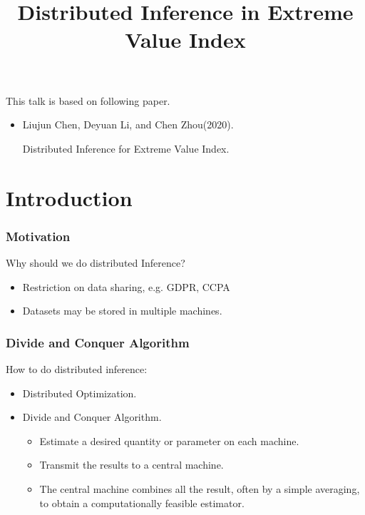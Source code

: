 \documentclass{beamer}
\title{Distributed Inference in Extreme Value Index}
\begin{document}
\begin{frame}
\titlepage
\begin{center}
\end{center}
\end{frame}

\begin{frame}
    \frametitle{}
This talk is based on following paper.
\begin{itemize}
    \item Liujun Chen, Deyuan Li, and Chen Zhou(2020). 
    
    {\color{blue} Distributed Inference for Extreme Value Index.}
\end{itemize}
    

\end{frame}

\section{Introduction}
\begin{frame}
    \frametitle{Motivation}
Why should we do distributed Inference?
\bigskip
\begin{itemize}
    \item Restriction on data sharing, e.g.  GDPR, CCPA
    \bigskip
    \item Datasets may be stored in multiple machines.
\end{itemize}

\end{frame}

\begin{frame}
    \frametitle{Divide and Conquer Algorithm}
How to do distributed inference:
\begin{itemize}
    \item Distributed Optimization. 
    \bigskip
    \item Divide and Conquer Algorithm.
        \begin{itemize}
            \item Estimate a desired quantity or parameter on each machine.

            \item Transmit the results to a central machine.
            \item The central machine combines all the result, often by a simple averaging, to obtain a computationally feasible estimator. 
        \end{itemize}
\end{itemize}
    

\end{frame}
\end{document}
